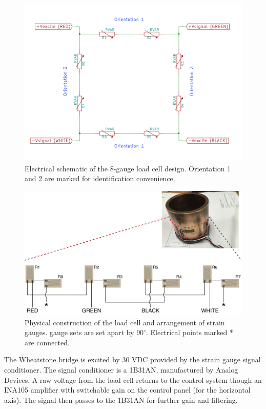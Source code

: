 \begin{figure}
	\centering
		\includegraphics[scale=0.3]{appendix_load_response/load_cell_schematic.png}
   	\caption{Electrical schematic of the 8-gauge load cell design. Orientation 1 and 2 are marked for identification convenience.}
  	\label{load_cell_schematic}
\end{figure}

\begin{figure}
	\centering
		\includegraphics[scale=0.6]{appendix_load_response/load_cell.png}
   	\caption{Physical construction of the load cell and arrangement of strain gauges. gauge sets are set apart by $90^\circ$. Electrical points marked * are connected.}
  	\label{load_cell_diagram}
\end{figure}

The Wheatstone bridge is excited by 30 VDC provided by the strain gauge signal conditioner. The signal conditioner is a 1B31AN, manufactured by Analog Devices. A raw voltage from the load cell returns to the control system though an INA105 amplifier with switchable gain on the control panel (for the horizontal axis). The signal then passes to the 1B31AN for further gain and filtering.  


